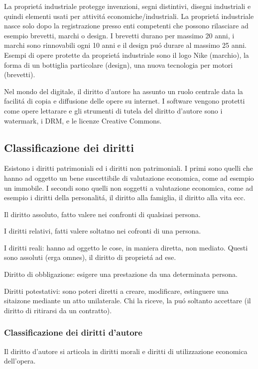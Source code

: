 \documentclass{article}
\begin{document}
La propriet\'a industriale protegge invenzioni, segni distintivi, disegni industriali e quindi elementi usati per attivit\'a economiche/industriali. La propriet\'a industriale nasce solo dopo la registrazione presso enti competenti che possono rilasciare ad esempio brevetti, marchi o design. I brevetti durano per massimo 20 anni, i marchi sono rinnovabili ogni 10 anni e il design pu\'o durare al massimo 25 anni. Esempi di opere protette da propriet\'a industriale sono il logo Nike (marchio), la forma di un bottiglia particolare (design), una nuova tecnologia per motori (brevetti).

Nel mondo del digitale, il diritto d'autore ha assunto un ruolo centrale data la facilit\'a di copia e diffusione delle opere su internet. I software vengono protetti come opere lettarare e gli strumenti di tutela del diritto d'autore sono i watermark, i DRM, e le licenze Creative Commons.

\subsection{Classificazione dei diritti}
Esistono i diritti patrimoniali ed i diritti non patrimoniali. I primi sono quelli che hanno ad oggetto un bene suscettibile di valutazione economica, come ad esempio un immobile. I secondi sono quelli non soggetti a valutazione economica, come ad esempio i diritti della personalit\'a, il diritto alla famiglia, il diritto alla vita ecc.

Il diritto assoluto, fatto valere nei confronti di qualsiasi persona. 

I diritti relativi, fatti valere soltatno nei cofronti di una persona. 

I diritti reali: hanno ad oggetto le cose, in maniera diretta, non mediato. Questi sono assoluti (erga omnes), il diritto di propriet\'a ad ese.

Diritto di obbligazione: esigere una prestazione da una determinata persona.

Diritti potestativi: sono poteri diretti a creare, modificare, estinguere una sitaizone mediante un atto unilaterale. Chi la riceve, la pu\'o soltanto accettare (il diritto di ritirarsi da un contratto).

\subsubsection{Classificazione dei diritti d'autore}
Il diritto d'autore si articola in diritti morali e diritti di utilizzazione economica dell'opera. 
\end{document}

